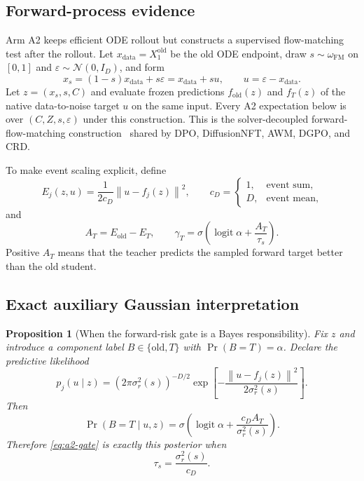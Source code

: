 \documentclass[11pt,a4paper]{article}
\newcommand{\N}{\mathcal{N}}
\newcommand{\norm}[1]{\left\lVert #1 \right\rVert}
\DeclareMathOperator{\logit}{logit}
\theoremstyle{plain}
\newtheorem{proposition}[theorem]{Proposition}
\theoremstyle{definition}
\begin{document}
\subsection{Forward-process evidence}

Arm A2 keeps efficient ODE rollout but constructs a supervised flow-matching test after the
rollout.  Let $x_{\mathrm{data}}=X_1^{\mathrm{old}}$ be the old ODE endpoint, draw
$s\sim\omega_{\mathrm{FM}}$ on $[0,1]$ and
$\varepsilon\sim\N(0,I_D)$, and form
\begin{equation}
x_s=(1-s)x_{\mathrm{data}}+s\varepsilon
    =x_{\mathrm{data}}+s u,
\qquad
u=\varepsilon-x_{\mathrm{data}}.
\label{eq:a2-forward-path}
\end{equation}
Let $z=(x_s,s,C)$ and evaluate frozen predictions
$f_{\mathrm{old}}(z)$ and $f_T(z)$ of the native data-to-noise target $u$ on the same input.
Every A2 expectation below is over $(C,Z,s,\varepsilon)$ under this construction.  This is the
solver-decoupled forward-flow-matching construction~\cite{flowmatching} shared by DPO,
DiffusionNFT, AWM, DGPO, and CRD.

To make event scaling explicit, define
\begin{equation}
E_j(z,u)
=
\frac{1}{2c_D}\norm{u-f_j(z)}^2,
\qquad
c_D=
\begin{cases}
1, & \text{event sum},\\
D, & \text{event mean},
\end{cases}
\label{eq:a2-energy}
\end{equation}
and
\begin{equation}
A_T=E_{\mathrm{old}}-E_T,
\qquad
\gamma_T
=
\sigma\!\left(
  \logit\alpha+\frac{A_T}{\tau_s}
\right).
\label{eq:a2-gate}
\end{equation}
Positive $A_T$ means that the teacher predicts the sampled forward target better than the old
student.

\subsection{Exact auxiliary Gaussian interpretation}

\begin{proposition}[When the forward-risk gate is a Bayes responsibility]
\label{prop:a2-gaussian}
Fix $z$ and introduce a component label $B\in\{\mathrm{old},T\}$ with
$\Pr(B=T)=\alpha$.  Declare the predictive likelihood
\begin{equation}
p_j(u\mid z)
=
(2\pi\sigma_r^2(s))^{-D/2}
\exp\!\left[
  -\frac{\norm{u-f_j(z)}^2}{2\sigma_r^2(s)}
\right].
\label{eq:a2-predictive-model}
\end{equation}
Then
\begin{equation}
\Pr(B=T\mid u,z)
=
\sigma\!\left(
  \logit\alpha
  +\frac{c_D A_T}{\sigma_r^2(s)}
\right).
\label{eq:a2-posterior}
\end{equation}
Therefore \eqref{eq:a2-gate} is exactly this posterior when
\begin{equation}
\tau_s=\frac{\sigma_r^2(s)}{c_D}.
\label{eq:a2-exact-temperature}
\end{equation}
\end{proposition}
\end{document}
